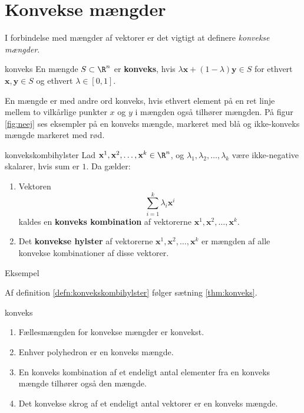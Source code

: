 \section{Konvekse mængder}
%
I forbindelse med mængder af vektorer er det vigtigt at definere \textit{konvekse mængder}.
%
\begin{defn}{}{konveks}
En mængde $S \subset \R^n$ er \textbf{konveks}, hvis $\lambda \textbf{x} + (1- \lambda ) \textbf{y} \in S$ for ethvert $\textbf{x}, \textbf{y} \in S$ og ethvert $\lambda \in [0,1]$. 
\end{defn}
\noindent
%
En mængde er med andre ord konveks, hvis ethvert element på en ret linje mellem to vilkårlige punkter $x$ og $y$ i mængden også tilhører mængden. 
På figur \ref{fig:neej} ses eksempler på en konveks mængde, markeret med blå og ikke-konveks mængde markeret med rød. 
%

%
\begin{defn}{}{konvekskombihylster}
Lad $\textbf{x}^1, \textbf{x}^2, \ldots, \textbf{x}^k \in \R^n$, og $\lambda_1, \lambda_2, \ldots, \lambda_k$ være ikke-negative skalarer, hvis sum er $1$. Da gælder:
%
\begin{enumerate}[label=(\alph*)]
	\item Vektoren $$\sum_{i=1}^{k} \lambda_i \textbf{x}^i$$ kaldes en \textbf{konveks kombination} af vektorerne $\textbf{x}^1, \textbf{x}^2, \ldots, \textbf{x}^k$. 
	\item Det \textbf{konvekse hylster} af vektorerne $\textbf{x}^1, \textbf{x}^2, \ldots, \textbf{x}^k$ er mængden af alle konvekse kombinationer af disse vektorer. 
\end{enumerate}
%
%
\end{defn}
%
Eksempel 
%

%
Af definition \ref{defn:konvekskombihylster} følger sætning \ref{thm:konveks}.
%
\begin{thm}{}{konveks}
\begin{enumerate}[label=(\alph*)]
	\item Fællesmængden for konvekse mængder er konvekst. 
	\item Enhver polyhedron er en konveks mængde.
	\item En konveks kombination af et endeligt antal elementer fra en konveks mængde tilhører også den mængde. 
	\item Det konvekse skrog af et endeligt antal vektorer er en konveks mængde. 
\end{enumerate}
\end{thm}
